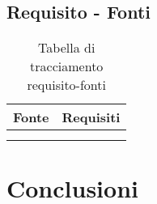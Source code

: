 \subsection{Requisito - Fonti}
\begin{table}[!ht]
  \centering
  \begin{tabular}{|c|c|}
    \hline
    \rowcolor[HTML]{036400}
    {\color[HTML]{FFFFFF} Fonte} & {\color[HTML]{FFFFFF} Requisiti} \\ \hline
    \rowcolor[HTML]{EFEFEF}
    &  \\ \hline
    \rowcolor[HTML]{C0C0C0}
    &  \\ \hline
  \end{tabular}
  \caption{Tabella di tracciamento requisito-fonti}
\end{table}

\section{Conclusioni}
